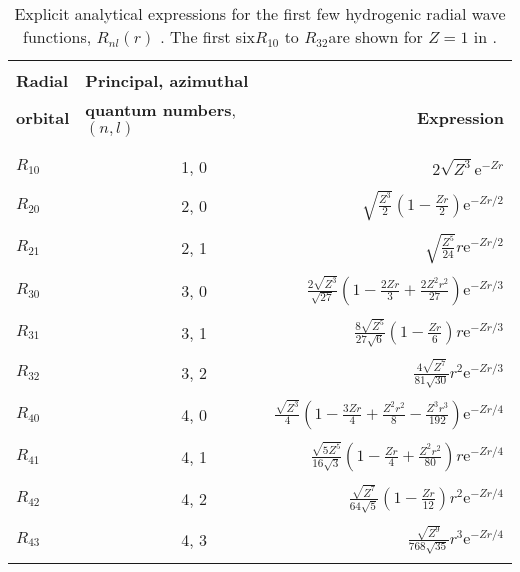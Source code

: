 \documentclass[../../master.tex]{subfiles}
\begin{document}
\begin{table}
\centering
\setlength\extrarowheight{2pt}
\begin{tabularx}{\textwidth}{l X  r}
\hline
\hline
\\[-0.9em]
{\bf Radial}  & {\bf Principal, azimuthal}     & \\ 
{\bf orbital} & {\bf quantum numbers}, $(n,l)$ & {\bf Expression} \\
\\[-0.9em]
\hline
\\[-0.9em]
$R_{10}$ & \ \ \ \ \ \ \ \ \ \ \ \ 1, 0 & $\displaystyle 2\sqrt{Z^3}\mathrm{e}^{-Zr}$ \\
\\[-0.5em]
$R_{20}$ & \ \ \ \ \ \ \ \ \ \ \ \ 2, 0 & $\displaystyle \sqrt{\frac{Z^3}{2}}\left(1-\frac{Zr}{2}\right)\mathrm{e}^{-Zr/2}$ \\
\\[-0.5em]
$R_{21}$ & \ \ \ \ \ \ \ \ \ \ \ \ 2, 1 & $\displaystyle \sqrt{\frac{Z^5}{24}} r \mathrm{e}^{-Zr/2}$ \\
\\[-0.5em]
$R_{30}$ & \ \ \ \ \ \ \ \ \ \ \ \ 3, 0 & $\displaystyle \frac{2\sqrt{Z^3}}{\sqrt{27}} \left( 1-\frac{2Zr}{3}+\frac{2Z^2r^2}{27}\right) \mathrm{e}^{-Zr/3}$ \\
\\[-0.5em]
$R_{31}$ & \ \ \ \ \ \ \ \ \ \ \ \ 3, 1 & $\displaystyle \frac{8\sqrt{Z^5}}{27\sqrt{6}} \left( 1-\frac{Zr}{6}\right)r \mathrm{e}^{-Zr/3}$ \\
\\[-0.5em]
$R_{32}$ & \ \ \ \ \ \ \ \ \ \ \ \ 3, 2 & $\displaystyle \frac{4\sqrt{Z^7}}{81\sqrt{30}} r^2 \mathrm{e}^{-Zr/3}$ \\
\\[-0.5em]
$R_{40}$ & \ \ \ \ \ \ \ \ \ \ \ \ 4, 0 & $\displaystyle \frac{\sqrt{Z^3}}{4} \left(1-\frac{3Zr}{4} + \frac{Z^2r^2}{8}-\frac{Z^3r^3}{192}\right)  \mathrm{e}^{-Zr/4}$ \\
\\[-0.5em]
$R_{41}$ & \ \ \ \ \ \ \ \ \ \ \ \ 4, 1 & $\displaystyle \frac{\sqrt{5Z^5}}{16\sqrt{3}} \left(1-\frac{Zr}{4} + \frac{Z^2r^2}{80}\right)r  \mathrm{e}^{-Zr/4}$ \\
\\[-0.5em]
$R_{42}$ & \ \ \ \ \ \ \ \ \ \ \ \ 4, 2 & $\displaystyle \frac{\sqrt{Z^7}}{64\sqrt{5}} \left(1-\frac{Zr}{12}\right)r^2  \mathrm{e}^{-Zr/4}$ \\
\\[-0.5em]
$R_{43}$ & \ \ \ \ \ \ \ \ \ \ \ \ 4, 3 & $\displaystyle \frac{\sqrt{Z^9}}{768\sqrt{35}} r^3  \mathrm{e}^{-Zr/4}$ \\
\\[-0.5em]
\hline
\end{tabularx}
\caption{Explicit analytical expressions for the first few hydrogenic radial wave functions, $R_{nl}(r)$ \cite{griffiths}. The first six\textemdash $R_{10}$ to $R_{32}$\textemdash are shown for $Z=1$ in . \label{tab:hydrogenorbitals}}
\end{table}
\end{document}

